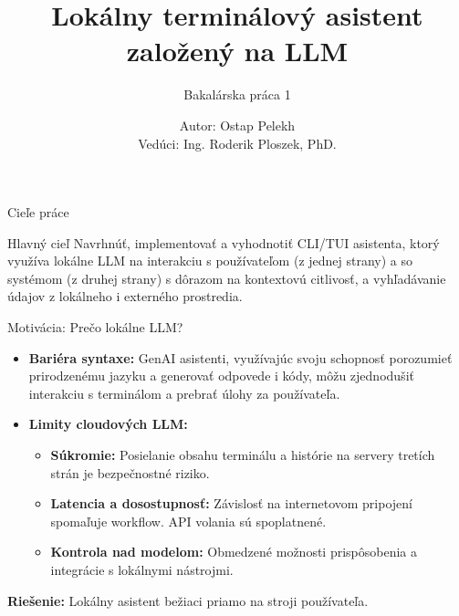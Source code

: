 \documentclass[10pt]{beamer}
\title[1st Term Progress]{Lokálny terminálový asistent založený na LLM}
\subtitle{Bakalárska práca 1}
\author[Ostap Pelekh]{Autor: Ostap Pelekh\\Vedúci: Ing. Roderik Ploszek, PhD.}
\institute[Slovak University of Technology in Bratislava]{Faculty of electrical engineering and information technology (FEI)}
\date[]{}
\begin{document}
\begin{frame}
    \titlepage
\end{frame}

\begin{frame}{Cieľe práce}
    \begin{block}{Hlavný cieľ}
        Navrhnúť, implementovať a vyhodnotiť CLI/TUI asistenta, ktorý využíva lokálne LLM
        na interakciu s používateľom (z jednej strany) a so systémom (z druhej
        strany) s dôrazom na kontextovú citlivosť, a vyhľadávanie údajov z lokálneho
        i externého prostredia.
    \end{block}

\end{frame}

\begin{frame}{Motivácia: Prečo lokálne LLM?}
    \begin{itemize}
        \item \textbf{Bariéra syntaxe:} GenAI asistenti, využívajúc
        svoju schopnosť porozumieť prirodzenému jazyku a generovať odpovede i
        kódy, môžu zjednodušiť interakciu s terminálom a prebrať úlohy za
        používateľa.
        \item \textbf{Limity cloudových LLM:}
            \begin{itemize}
                \item \textbf{Súkromie:} Posielanie obsahu terminálu a histórie na servery tretích strán je bezpečnostné riziko.
                \item \textbf{Latencia a dosostupnosť:} Závislosť na internetovom pripojení spomaľuje workflow. API volania sú spoplatnené.
                \item \textbf{Kontrola nad modelom:} Obmedzené možnosti prispôsobenia a integrácie s lokálnymi nástrojmi.
            \end{itemize}
    \end{itemize}
    \vspace{0.3cm}
    \begin{center}
        \textbf{Riešenie:} Lokálny asistent bežiaci priamo na stroji používateľa.
    \end{center}

\end{frame}
\end{document}
